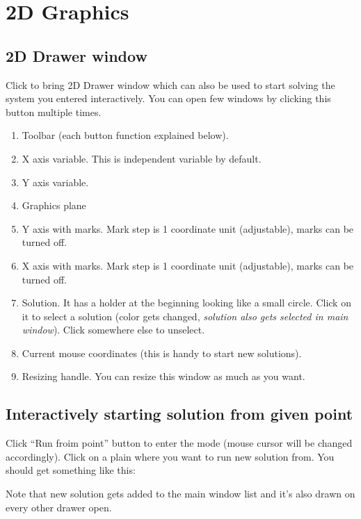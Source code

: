 \documentclass[12pt]{article}
\begin{document}
\section{2D Graphics}

\subsection{2D Drawer window}

Click  to bring 2D Drawer window which can also be used to start 
solving the system you entered interactively. You can open few windows by clicking this button multiple times.


\begin{enumerate}
\item Toolbar (each button function explained below).
\item X axis variable. This is independent variable by default.
\item Y axis variable.
\item Graphics plane
\item Y axis with marks. Mark step is 1 coordinate unit (adjustable), marks can be turned off.
\item X axis with marks. Mark step is 1 coordinate unit (adjustable), marks can be turned off.
\item Solution. It has a holder at the beginning looking like a small circle. Click on it to select a solution 
(color gets changed, \textit{solution also gets selected in main window}). Click somewhere else to unselect.
\item Current mouse coordinates (this is handy to start new solutions).
\item Resizing handle. You can resize this window as much as you want.
\end{enumerate}

\subsection{Interactively starting solution from given point}

Click ``Run froim point'' button  to enter the mode (mouse cursor will be changed accordingly).
Click on a plain where you want to run new solution from. You should get something like this:


Note that new solution gets added to the main window list and it's also drawn on every other drawer open.
\end{document}
